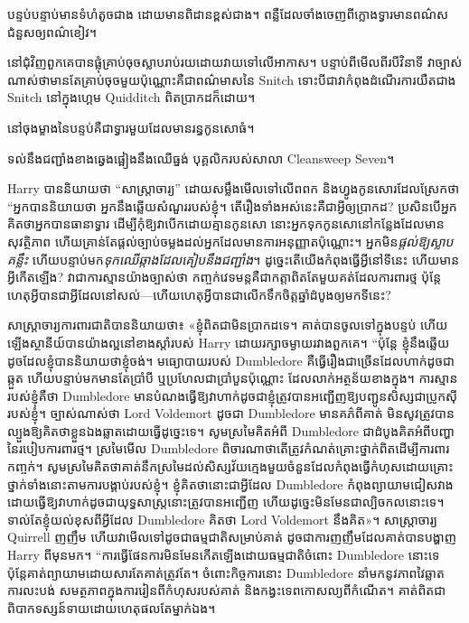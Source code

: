 \later

បន្ទប់បន្ទាប់មានទំហំតូចជាង ដោយមានពិដានខ្ពស់ជាង។ ពន្លឺ​ដែល​ចាំង​ចេញ​ពី​ក្លោង​ទ្វារ​មាន​ពណ៌​ស ជំនួស​ឲ្យ​ពណ៌​ខៀវ។

នៅ​ជុំវិញ​ពួក​គេ​បាន​ផ្លុំ​គ្រាប់​ចុច​ស្លាប​រាប់រយ​ដោយ​វាយ​ទៅ​លើ​អាកាស។ បន្ទាប់ពីមើលពីរបីវិនាទី វាច្បាស់ណាស់ថាមានតែគ្រាប់ចុចមួយប៉ុណ្ណោះគឺជាពណ៌មាសនៃ Snitch ទោះបីជាវាកំពុងដំណើរការយឺតជាង Snitch នៅក្នុងហ្គេម Quidditch ពិតប្រាកដក៏ដោយ។

នៅចុងម្ខាងនៃបន្ទប់គឺជាទ្វារមួយដែលមានរន្ធកូនសោធំ។

ទល់​នឹង​ជញ្ជាំង​ខាង​ឆ្វេង​ផ្អៀង​នឹង​ឈើ​ធ្នង់ បុគ្គលិក​របស់​សាលា Cleansweep Seven។

Harry បាននិយាយថា “សាស្រ្តាចារ្យ” ដោយសម្លឹងមើលទៅលើពពក និងហ្វូងកូនសោរដែលស្រែកថា “អ្នកបាននិយាយថា អ្នកនឹងឆ្លើយសំណួររបស់ខ្ញុំ។ តើ​រឿង​ទាំង​អស់​នេះ​គឺ​ជា​អ្វី​ឲ្យ​ប្រាកដ? ប្រសិនបើអ្នកគិតថាអ្នកបានធានាទ្វារ ដើម្បីកុំឱ្យវាបើកដោយគ្មានកូនសោ នោះអ្នកទុកកូនសោនៅកន្លែងដែលមានសុវត្ថិភាព ហើយគ្រាន់តែផ្តល់ច្បាប់ចម្លងដល់អ្នកដែលមានការអនុញ្ញាតប៉ុណ្ណោះ។ អ្នកមិន\emph{ផ្តល់ឱ្យស្លាបគន្លឹះ} ហើយបន្ទាប់មក\emph{ទុកឈើឆ្កាងដែលគៀបនឹងជញ្ជាំង}។ ដូច្នេះ​តើ​យើង​កំពុង​ធ្វើ​អ្វី​នៅ​ទី​នេះ ហើយ​មាន​អ្វី​កើត​ឡើង? វា​ជា​ការ​ស្មាន​យ៉ាង​ច្បាស់​ថា កញ្ចក់​វេទមន្ត​គឺ​ជា​កត្តា​ពិត​តែ​មួយ​គត់​ដែល​ការពារ​ថ្ម ប៉ុន្តែ​ហេតុ​អ្វី​បាន​ជា​អ្វី​ដែល​នៅ​សល់—ហើយ​ហេតុ​អ្វី​បាន​ជា​លើក​ទឹក​ចិត្ត​ឆ្នាំ​ដំបូង​ឲ្យ​មក​ទី​នេះ?

សាស្ត្រាចារ្យ​ការពារ​ជាតិ​បាន​និយាយ​ថា​៖ «​ខ្ញុំ​ពិតជា​មិន​ប្រាកដ​ទេ​។ គាត់បានចូលទៅក្នុងបន្ទប់ ហើយឡើងស្ថានីយ៍បានយ៉ាងល្អនៅខាងស្តាំរបស់ Harry ដោយរក្សាចម្ងាយរវាងពួកគេ។ “ប៉ុន្តែ ខ្ញុំ​នឹង​ឆ្លើយ​ដូច​ដែល​ខ្ញុំ​បាន​និយាយ​ថា​ខ្ញុំ​ចង់​។ មធ្យោបាយរបស់ Dumbledore គឺធ្វើរឿងជាច្រើនដែលហាក់ដូចជាឆ្កួត ហើយបន្ទាប់មកមានតែប្រាំបី ឬប្រហែលជាប្រាំបួនប៉ុណ្ណោះ ដែលលាក់អត្ថន័យខាងក្នុង។ ការស្មានរបស់ខ្ញុំគឺថា Dumbledore មានបំណងធ្វើឱ្យវាហាក់ដូចជាខ្ញុំត្រូវបានអញ្ជើញឱ្យបញ្ជូនសិស្សជាប្រូកស៊ីរបស់ខ្ញុំ។ ច្បាស់ណាស់ថា Lord Voldemort ដូចជា Dumbledore មានគភ៌ពីគាត់ មិនសូវត្រូវបានល្បួងឱ្យគិតថាខ្លួនឯងឆ្លាតដោយធ្វើដូច្នេះទេ។ សូមស្រមៃគិតអំពី Dumbledore ជាដំបូងគិតអំពីបញ្ហានៃរបៀបការពារថ្ម។ ស្រមៃមើល Dumbledore ពិចារណាថាតើត្រូវកំណត់គ្រោះថ្នាក់ពិតដើម្បីការពារកញ្ចក់។ សូម​ស្រមៃ​គិត​ថា​គាត់​នឹក​ស្រមៃ​ដល់​សិស្ស​វ័យ​ក្មេង​មួយ​ចំនួន​ដែល​កំពុង​ធ្វើ​កំហុស​ដោយ​គ្រោះថ្នាក់​ទាំង​នោះ​តាម​ការ​បង្គាប់​របស់​ខ្ញុំ។ ខ្ញុំគិតថានោះជាអ្វីដែល Dumbledore កំពុងព្យាយាមជៀសវាង ដោយធ្វើឱ្យវាហាក់ដូចជាយុទ្ធសាស្ត្រនោះត្រូវបានអញ្ជើញ ហើយដូច្នេះមិនមែនជាល្បិចកលនោះទេ។ ទាល់​តែ​ខ្ញុំ​យល់​ខុស​ពី​អ្វី​ដែល Dumbledore គិត​ថា Lord Voldemort នឹង​គិត»។ សាស្ត្រាចារ្យ Quirrell ញញឹម ហើយវាមើលទៅដូចជាធម្មជាតិសម្រាប់គាត់ ដូចជាការញញឹមដែលគាត់បានបង្ហាញ Harry ពីមុនមក។ “ការធ្វើផែនការមិនមែនកើតឡើងដោយធម្មជាតិចំពោះ Dumbledore នោះទេ ប៉ុន្តែគាត់ព្យាយាមដោយសារតែគាត់ត្រូវតែ។ ចំពោះកិច្ចការនោះ Dumbledore នាំមកនូវភាពវៃឆ្លាត ការលះបង់ សមត្ថភាពក្នុងការរៀនពីកំហុសរបស់គាត់ និងកង្វះទេពកោសល្យពីកំណើត។ គាត់ពិតជាពិបាកទស្សន៍ទាយដោយហេតុផលតែម្នាក់ឯង។

